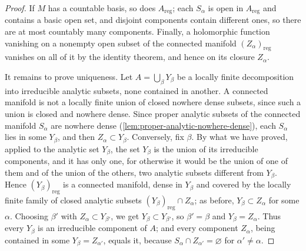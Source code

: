 \begin{proof}
If $M$ has a countable basis, so does $A_{\mathrm{reg}}$; each $S_\alpha$ is open in $A_{\mathrm{reg}}$ and contains a basic open set, and disjoint components contain different ones, so there are at most countably many components. Finally, a holomorphic function vanishing on a nonempty open subset of the connected manifold $(Z_\alpha)_{\mathrm{reg}}$ vanishes on all of it by the identity theorem, and hence on its closure $Z_\alpha$.

It remains to prove uniqueness. Let $A=\bigcup_\beta Y_\beta$ be a locally finite decomposition into irreducible analytic subsets, none contained in another. A connected manifold is not a locally finite union of closed nowhere dense subsets, since such a union is closed and nowhere dense. Since proper analytic subsets of the connected manifold $S_\alpha$ are nowhere dense (\cref{lem:proper-analytic-nowhere-dense}), each $S_\alpha$ lies in some $Y_\beta$, and then $Z_\alpha\subset Y_\beta$. Conversely, fix $\beta$. By what we have proved, applied to the analytic set $Y_\beta$, the set $Y_\beta$ is the union of its irreducible components, and it has only one, for otherwise it would be the union of one of them and of the union of the others, two analytic subsets different from $Y_\beta$. Hence $(Y_\beta)_{\mathrm{reg}}$ is a connected manifold, dense in $Y_\beta$ and covered by the locally finite family of closed analytic subsets $(Y_\beta)_{\mathrm{reg}}\cap Z_\alpha$; as before, $Y_\beta\subset Z_\alpha$ for some $\alpha$. Choosing $\beta'$ with $Z_\alpha\subset Y_{\beta'}$, we get $Y_\beta\subset Y_{\beta'}$, so $\beta'=\beta$ and $Y_\beta=Z_\alpha$. Thus every $Y_\beta$ is an irreducible component of $A$; and every component $Z_\alpha$, being contained in some $Y_\beta=Z_{\alpha'}$, equals it, because $S_\alpha\cap Z_{\alpha'}=\varnothing$ for $\alpha'\neq\alpha$.
\end{proof}

